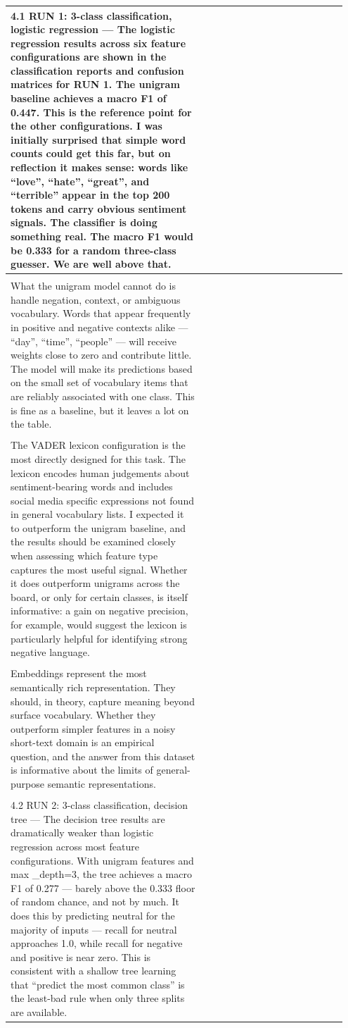 \documentclass[11pt]{article}
\begin{document}
\begin{longtable}{|p{0.55\linewidth}|p{0.40\linewidth}|}
\hline
4.1 RUN 1: 3-class classification, logistic regression --- The logistic regression results across six feature configurations are shown in the classification reports and confusion matrices for RUN 1. The unigram baseline achieves a macro F1 of 0.447. This is the reference point for the other configurations. I was initially surprised that simple word counts could get this far, but on reflection it makes sense: words like ``love'', ``hate'', ``great'', and ``terrible'' appear in the top 200 tokens and carry obvious sentiment signals. The classifier is doing something real. The macro F1 would be 0.333 for a random three-class guesser. We are well above that. & \\[2pt]
\hline
\rule{0pt}{3.5cm} & \\
\hline
What the unigram model cannot do is handle negation, context, or ambiguous vocabulary. Words that appear frequently in positive and negative contexts alike --- ``day'', ``time'', ``people'' --- will receive weights close to zero and contribute little. The model will make its predictions based on the small set of vocabulary items that are reliably associated with one class. This is fine as a baseline, but it leaves a lot on the table. & \\[2pt]
\hline
\rule{0pt}{3.5cm} & \\
\hline
The VADER lexicon configuration is the most directly designed for this task. The lexicon encodes human judgements about sentiment-bearing words and includes social media specific expressions not found in general vocabulary lists. I expected it to outperform the unigram baseline, and the results should be examined closely when assessing which feature type captures the most useful signal. Whether it does outperform unigrams across the board, or only for certain classes, is itself informative: a gain on negative precision, for example, would suggest the lexicon is particularly helpful for identifying strong negative language. & \\[2pt]
\hline
\rule{0pt}{3.5cm} & \\
\hline
Embeddings represent the most semantically rich representation. They should, in theory, capture meaning beyond surface vocabulary. Whether they outperform simpler features in a noisy short-text domain is an empirical question, and the answer from this dataset is informative about the limits of general-purpose semantic representations. & \\[2pt]
\hline
\rule{0pt}{3.5cm} & \\
\hline
4.2 RUN 2: 3-class classification, decision tree --- The decision tree results are dramatically weaker than logistic regression across most feature configurations. With unigram features and max \_depth=3, the tree achieves a macro F1 of 0.277 --- barely above the 0.333 floor of random chance, and not by much. It does this by predicting neutral for the majority of inputs --- recall for neutral approaches 1.0, while recall for negative and positive is near zero. This is consistent with a shallow tree learning that ``predict the most common class'' is the least-bad rule when only three splits are available. & \\[2pt]

\end{longtable}
\end{document}
